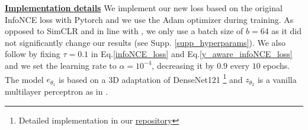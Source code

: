\documentclass[runningheads]{llncs}
\newcommand{\benoit}[1]{\textcolor{red}{#1}}
\newcommand{\PG}[1]{\textcolor{magenta}{#1}}
\newcommand{\ED}[1]{\textcolor{orange}{#1}}
\begin{document}
\justify
\underline{\textbf{Implementation details}}
We implement our new loss based on the original InfoNCE loss \cite{chen2020simCLR} with Pytorch \cite{paszke2019pytorch} and we use  
the Adam optimizer during training. As opposed to SimCLR \cite{chen2020simCLR} and in line with \cite{chaitanya2020contrastive}, we only use a batch size of $b=64$ as it did not significantly change our results (see Supp. \ref{supp_hyperparams}). We also follow \cite{chen2020simCLR} by fixing $\tau=0.1$ in Eq.\ref{infoNCE_loss} and Eq.\ref{y_aware_infoNCE_loss} and we set the learning rate to $\alpha=10^{-4}$, decreasing it by $0.9$ every $10$ epochs. The model $e_{\theta_1}$ is based on a 3D adaptation of DenseNet121 \footnote{Detailed implementation in our \href{https://github.com/Duplums/yAwareContrastiveLearning}{repository}} \cite{DenseNet_Huang} and $z_{\theta_2}$ is a vanilla  multilayer perceptron as in \cite{chen2020simCLR}.%






\end{document}
